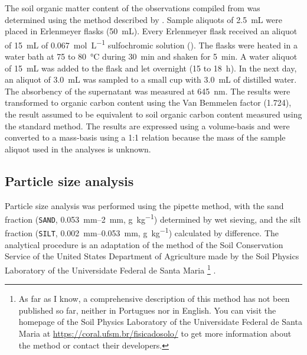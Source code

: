 The soil organic matter content of the observations compiled from  was determined 
using the method described by . Sample aliquots of \SI{2.5}{\milli\liter}
were placed in Erlenmeyer flasks (\SI{50}{\milli\liter}). Every Erlenmeyer flask received an aliquot of 
\SI{15}{\milli\liter} of \SI{0.067}{\mole\per\liter} sulfochromic solution (). The 
flasks were heated in a water bath at \num{75} to \SI{80}{\celsius} during \SI{30}{\minute} and shaken 
for \SI{5}{\minute}. A water aliquot of \SI{15}{\milli\liter} was added to the flask and let overnight 
(\num{15} to \SI{18}{\hour}). In the next day, an aliquot of \SI{3.0}{\milli\liter} was sampled to a 
small cup with \SI{3.0}{\milli\liter} of distilled water. The absorbency of the supernatant was measured 
at \SI{645}{\nano\metre}. The results were transformed to organic carbon content using the Van Bemmelen 
factor (\num{1.724}), the result assumed to be equivalent to soil organic carbon content measured using the 
standard method. The results are expressed using a volume-basis and were converted to a mass-basis using a
1:1 relation because the mass of the sample aliquot used in the analyses is unknown.

\tocless\subsection{Particle size analysis}
\label{apen:soil-data-clay}

Particle size analysis was performed using the pipette method, with the sand fraction 
(\texttt{SAND}, \SIrange{0.053}{2}{\milli\metre}, \si{\gram\per\kilo\gram}) determined by wet sieving, and the 
silt 
fraction (\texttt{SILT}, \SIrange{0.002}{0.053}{\milli\metre}, \si{\gram\per\kilo\gram}) calculated by 
difference. 
The analytical procedure is an adaptation of the method of the Soil Conservation Service of the United States
Department of Agriculture \cite{UnitedStates1972} made by the Soil Physics Laboratory of the Universidate
Federal de Santa Maria \footnote{As far as I know, a comprehensive description of this method has not been 
published so far, neither in Portugues nor in English. You can visit the homepage of the Soil Physics 
Laboratory 
of the Universidate Federal de Santa Maria at \url{https://coral.ufsm.br/fisicadosolo/} to get more information
about the method or contact their developers.} \cite{SuzukiEtAl2004,SuzukiEtAl2004a}.

